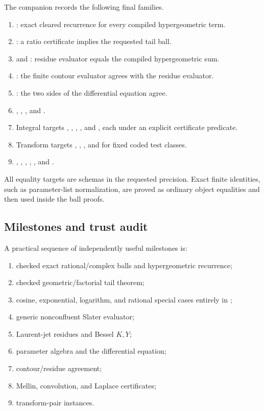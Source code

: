 The companion  records the following final
families.
\begin{enumerate}
\item {}: exact cleared recurrence for every compiled
      hypergeometric term.
\item {}: a ratio certificate implies the requested tail ball.
\item {} and : residue evaluator equals the
      compiled hypergeometric sum.
\item {}: the finite contour evaluator agrees with
      the residue evaluator.
\item {}: the two sides of the differential equation agree.
\item {}, , , and
      .
\item Integral targets , , ,
      , and , each under an explicit
      certificate predicate.
\item Transform targets , ,
      , and  for fixed coded test classes.
\item {}, , ,
      , , and .
\end{enumerate}
All equality targets are  schemas in the requested precision.
Exact finite identities, such as parameter-list normalization, are proved as
ordinary object equalities and then used inside the ball proofs.

\subsection{Milestones and trust audit}

A practical sequence of independently useful milestones is:
\begin{enumerate}
\item checked exact rational/complex balls and hypergeometric recurrence;
\item checked geometric/factorial tail theorem;
\item cosine, exponential, logarithm, and rational special cases entirely in
      ;
\item generic nonconfluent Slater evaluator;
\item Laurent-jet residues and Bessel $K,Y$;
\item parameter algebra and the differential equation;
\item contour/residue agreement;
\item Mellin, convolution, and Laplace certificates;
\item transform-pair instances.
\end{enumerate}

